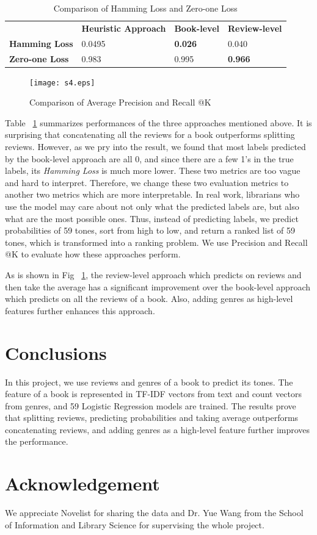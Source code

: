 \documentclass[runningheads]{llncs}
\begin{document}
\begin{table}[!htb]
 \caption{Comparison of Hamming Loss and Zero-one Loss}
  \centering
  \begin{tabular}{llll}
    \toprule
     & \textbf{Heuristic Approach} & \textbf{Book-level} & \textbf{Review-level} \\
    \textbf{Hamming Loss} & 0.0495 & \textbf{0.026} & 0.040\\
    \textbf{Zero-one Loss} & 0.983 & 0.995 & \textbf{0.966}\\
    \bottomrule
  \end{tabular}
  \label{compare}
\end{table}

\begin{figure}[!htb]
\texttt{[image: s4.eps]}
\caption{Comparison of Average Precision and Recall @K} 
\label{fig4}
\end{figure}

Table ~\ref{compare} summarizes performances of the three approaches mentioned above. It is surprising that concatenating all the reviews for a book outperforms splitting reviews. However, as we pry into the result, we found that most labels predicted by the book-level approach are all 0, and since there are a few 1's in the true labels, its \emph{Hamming Loss} is much more lower. These two metrics are too vague and hard to interpret. Therefore, we change these two evaluation metrics to another two metrics which are more interpretable. In real work, librarians who use the model may care about not only what the predicted labels are, but also what are the most possible ones. Thus, instead of predicting labels, we predict probabilities of 59 tones, sort from high to low, and return a ranked list of 59 tones, which is transformed into a ranking problem. We use Precision and Recall @K to evaluate how these approaches perform. 

As is shown in Fig ~\ref{fig4}, the review-level approach which predicts on reviews and then take the average has a significant improvement over the book-level approach which predicts on all the reviews of a book. Also, adding genres as high-level features further enhances this approach.

\section{Conclusions}
In this project, we use reviews and genres of a book to predict its tones. The feature of a book is represented in TF-IDF vectors from text and count vectors from genres, and 59 Logistic Regression models are trained. The results prove that splitting reviews, predicting probabilities and taking average outperforms concatenating reviews, and adding genres as a high-level feature further improves the performance.

\section{Acknowledgement}
We appreciate Novelist for sharing the data and Dr. Yue Wang from the School of Information and Library Science for supervising the whole project. 

\newpage


\end{document}
